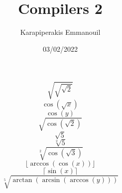 \documentclass[12pt]{article}
\title{Compilers 2}
\begin{document}
\author{Karapiperakis Emmanouil}
\date{03/02/2022}
\maketitle
\[ \sqrt{\sqrt{\sqrt{2}}} \]
\[ \cos(\sqrt{x}) \]
\[ \cos(y) \]
\[ \sqrt{\cos(\sqrt{2})} \]
\[ \sqrt{5} \]
\[ \sqrt[2]{5} \] 
\[ \sqrt[2]{\cos(\sqrt{3})} \]
\[ \lfloor \arccos(\cos(x)) \rfloor \]
\[ \lceil \sin(x) \rceil \]
\[ \sqrt[5]{\arctan(\arcsin(\arccos(y)))} \]
\end{document}
